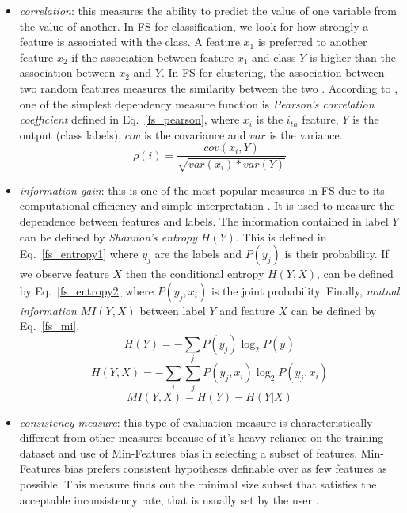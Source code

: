 \begin{itemize}
  \item \textit{correlation}: this measures the ability to predict the value of one variable from the value of another. In FS for classification, we look for how strongly a feature is associated with the class. A feature $x_{1}$ is preferred to another feature $x_{2}$ if the association between feature $x_{1}$ and class $Y$ is higher than the association between $x_{2}$ and $Y$. In FS for clustering, the association between two random features measures the similarity between the two \citep{liu2005toward}. According to \citet{guyon2003introduction}, one of the simplest dependency measure function is \textit{Pearson's correlation coefficient} defined in Eq.~\ref{fs_pearson}, where $x_{i}$ is the $i_{th}$ feature, $Y$ is the output (class labels), $cov$ is the covariance and $var$ is the variance.
  \begin{equation}\label{fs_pearson}
    \rho(i) = \frac{cov(x_{i},Y)}{\sqrt{var(x_{i})*var(Y)}}
  \end{equation}
  \item \textit{information gain}:  this is one of the most popular measures in FS due to its computational efficiency and simple interpretation \citep{tang2014feature}. It is used to measure the dependence between features and labels. The information contained in label $Y$ can be defined by \textit{Shannon's entropy} $H(Y)$. This is defined in Eq.~\ref{fs_entropy1} where $y_{j}$ are the labels and $P(y_{j})$ is their probability. If we observe feature $X$ then the conditional entropy $H(Y, X)$, can be defined by Eq.~\ref{fs_entropy2} where $P(y_{j},x_{i})$ is the joint probability. Finally, \textit{mutual information} $MI(Y,X)$ between label $Y$ and feature $X$ can be defined by Eq.~\ref{fs_mi}.
  \begin{equation}\label{fs_entropy1}
    H(Y) = -\sum_j P(y_{j})\log_{2} P(y_{})
  \end{equation}  
  \begin{equation}\label{fs_entropy2}
    H(Y, X) = -\sum_i\sum_j P(y_{j},x_{i})\log_{2}P(y_{j},x_{i})
  \end{equation}
  \begin{equation}\label{fs_mi}
    MI(Y,X) = H(Y) - H(Y|X)
  \end{equation}
  \item \textit{consistency measure}: this type of evaluation measure is characteristically different from other measures because of it's heavy reliance on the training dataset and use of Min-Features bias in selecting a subset of features. Min-Features bias prefers consistent hypotheses definable over as few features as possible. This measure finds out the minimal size subset that satisfies the acceptable inconsistency rate, that is usually set by the user \citep{liu2005toward}.
\end{itemize}

